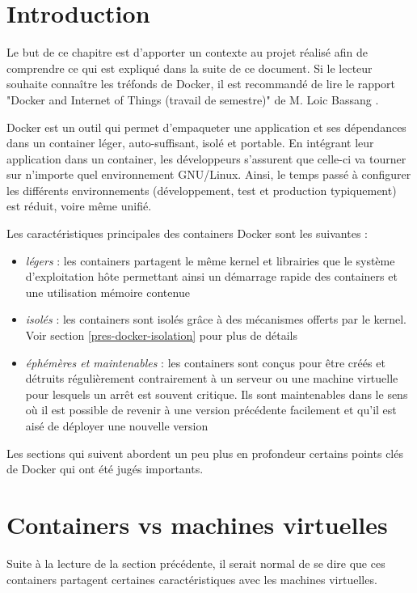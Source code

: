 \newcommand{\bassangPrjSemestre}{Docker and Internet of Things (travail de semestre)}
\newcommand{\bassangPrjBachelor}{Docker and Internet of Things (travail de Bachelor)}
\section{Introduction}

Le but de ce chapitre est d'apporter un contexte au projet réalisé afin de comprendre ce qui est expliqué dans la suite de ce document. Si le lecteur souhaite connaître les tréfonds de Docker, il est recommandé de lire le rapport "\bassangPrjSemestre" de M. Loic Bassang \cite{bassang_semestre}. 

Docker est un outil qui permet d'empaqueter une application et ses dépendances dans un container léger, auto-suffisant, isolé et portable. En intégrant leur application dans un container, les développeurs s'assurent que celle-ci va tourner sur n'importe quel environnement GNU/Linux. Ainsi, le temps passé à configurer les différents environnements (développement, test et production typiquement) est réduit, voire même unifié\cite{shipping_container_linux_code}\cite{wikipedia_docker}\cite{what_is_docker}.

Les caractéristiques principales des containers Docker sont les suivantes :
\begin{itemize}
\item \textit{légers} : les containers partagent le même kernel et librairies que le système d'exploitation hôte permettant ainsi un démarrage rapide des containers et une utilisation mémoire contenue
\item \textit{isolés} : les containers sont isolés grâce à des mécanismes offerts par le kernel. Voir section \ref{pres-docker-isolation} pour plus de détails
\item \textit{éphémères et maintenables} : les containers sont conçus pour être créés et détruits régulièrement contrairement à un serveur ou une machine virtuelle pour lesquels un arrêt est souvent critique. Ils sont maintenables dans le sens où il est possible de revenir à une version précédente facilement et qu'il est aisé de déployer une nouvelle version
\end{itemize}

Les sections qui suivent abordent un peu plus en profondeur certains points clés de Docker qui ont été jugés importants.

\section{Containers vs machines virtuelles}
Suite à la lecture de la section précédente, il serait normal de se dire que ces containers partagent certaines caractéristiques avec les machines virtuelles.

